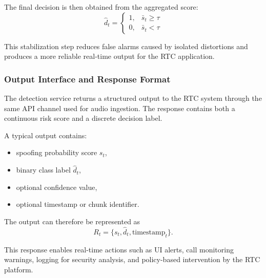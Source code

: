 The final decision is then obtained from the aggregated score:
\begin{equation}
\hat{d}_t =
\begin{cases}
1, & \bar{s}_t \geq \tau \\
0, & \bar{s}_t < \tau
\end{cases}
\end{equation}

This stabilization step reduces false alarms caused by isolated distortions and produces a more reliable real-time output for the RTC application.

\subsubsection{Output Interface and Response Format}

The detection service returns a structured output to the RTC system through the same API channel used for audio ingestion. The response contains both a continuous risk score and a discrete decision label.

A typical output contains:
\begin{itemize}
    \item spoofing probability score \(s_t\),
    \item binary class label \(\hat{d}_t\),
    \item optional confidence value,
    \item optional timestamp or chunk identifier.
\end{itemize}

The output can therefore be represented as
\begin{equation}
R_t = \{s_t, \hat{d}_t, \text{timestamp}_t\}.
\end{equation}

This response enables real-time actions such as UI alerts, call monitoring warnings, logging for security analysis, and policy-based intervention by the RTC platform.